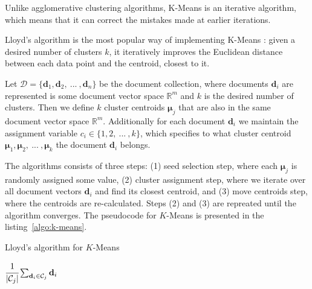 Unlike agglomerative clustering algorithms, K-Means is an iterative
algorithm, which means that it can correct the mistakes made
at earlier iterations.

Lloyd's algorithm  is the most popular way of implementing K-Means
\cite{xu2005survey}: given a desired number of clusters $k$,
it iteratively improves the Euclidean distance between each data
point and the centroid, closest to it.


Let $\mathcal D = \{  \mathbf d_1, \mathbf d_2, \ ... \ , \mathbf d_n \}$
be the document collection, where documents $\mathbf d_i$ are represented
is some document vector space $\mathbb R^m$ and $k$ is the desired
number of clusters. Then we define $k$ cluster centroids $\boldsymbol \mu_j$ that are
also in the same document vector space $\mathbb R^m$.
Additionally for each document $\mathbf d_i$ we maintain the assignment
variable $c_i \in \{ 1, 2, \ ... \ , k \}$, which specifies to what
cluster centroid $\boldsymbol \mu_1, \boldsymbol \mu_2, \ ... \ , \boldsymbol \mu_k$
the document $\mathbf d_i$ belongs.


The algorithms consists of three steps: (1) seed selection step,
where each $\boldsymbol \mu_j$ is randomly assigned some value,
(2) cluster assignment step, where we iterate over all document vectors
$\mathbf d_i$ and find its closest centroid, and (3)  move centroids step,
where the centroids are re-calculated. Steps (2) and (3) are repreated
until the algorithm converges. The pseudocode for $K$-Means is presented
in the listing~\ref{algo:k-means}.


\begin{algorithm}
\caption{Lloyd's algorithm for $K$-Means}
\label{algo:k-means}

\begin{algorithmic}[0]
  \Statex
     
    \EndFor

       
      \EndFor

       
            {$\cfrac{1}{| \mathcal C_j |} \sum_{\mathbf d_i \in \mathcal C_j} \mathbf d_i$}
      \EndFor
    \EndWhile

    \State {}
  \EndFunction
\end{algorithmic}
\end{algorithm}

